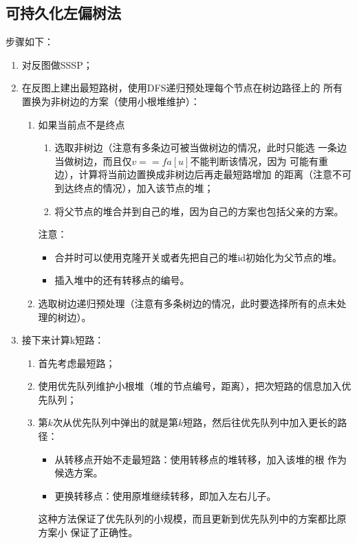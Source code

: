 \subsection{可持久化左偏树法}
步骤如下：
\begin{enumerate}
	\item 对反图做SSSP；
	\item 在反图上建出最短路树，使用DFS递归预处理每个节点在树边路径上的
	      所有置换为非树边的方案（使用小根堆维护）：
	      \begin{enumerate}
		      \item 如果当前点不是终点
		            \begin{enumerate}
			            \item 选取非树边（注意有多条边可被当做树边的情况，此时只能选
			                  一条边当做树边，而且仅$v==fa[u]$不能判断该情况，因为
			                  可能有重边），计算将当前边置换成非树边后再走最短路增加
			                  的距离（注意不可到达终点的情况），加入该节点的堆；
			            \item 将父节点的堆合并到自己的堆，因为自己的方案也包括父亲的方案。
		            \end{enumerate}
		            注意：
		            \begin{itemize}
			            \item 合并时可以使用克隆开关或者先把自己的堆id初始化为父节点的堆。
			            \item 插入堆中的还有转移点的编号。
		            \end{itemize}

		      \item 选取树边递归预处理（注意有多条树边的情况，此时要选择所有的点未处
		            理的树边）。
	      \end{enumerate}
	\item 接下来计算k短路：
	      \begin{enumerate}
		      \item 首先考虑最短路；
		      \item 使用优先队列维护小根堆（堆的节点编号，距离），把次短路的信息加入优先队列；
		      \item 第$k$次从优先队列中弹出的就是第$k$短路，然后往优先队列中加入更长的路径：
		            \begin{itemize}
			            \item 从转移点开始不走最短路：使用转移点的堆转移，加入该堆的根
			                  作为候选方案。
			            \item 更换转移点：使用原堆继续转移，即加入左右儿子。
		            \end{itemize}
		            这种方法保证了优先队列的小规模，而且更新到优先队列中的方案都比原方案小
		            保证了正确性。
	      \end{enumerate}
\end{enumerate}

